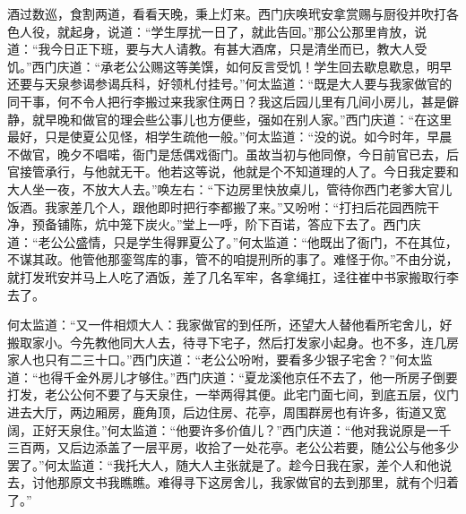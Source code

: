 酒过数巡，食割两道，看看天晚，秉上灯来。西门庆唤玳安拿赏赐与厨役并吹打各色人役，就起身，说道：“学生厚扰一日了，就此告回。”那公公那里肯放，说道：“我今日正下班，要与大人请教。有甚大酒席，只是清坐而已，教大人受饥。”西门庆道：“承老公公赐这等美馔，如何反言受饥！学生回去歇息歇息，明早还要与天泉参谒参谒兵科，好领札付挂号。”何太监道：“既是大人要与我家做官的同干事，何不令人把行李搬过来我家住两日？我这后园儿里有几间小房儿，甚是僻静，就早晚和做官的理会些公事儿也方便些，强如在别人家。”西门庆道：“在这里最好，只是使夏公见怪，相学生疏他一般。”何太监道：“没的说。如今时年，早晨不做官，晚夕不唱喏，衙门是恁偶戏衙门。虽故当初与他同僚，今日前官已去，后官接管承行，与他就无干。他若这等说，他就是个不知道理的人了。今日我定要和大人坐一夜，不放大人去。”唤左右：“下边房里快放桌儿，管待你西门老爹大官儿饭酒。我家差几个人，跟他即时把行李都搬了来。”又吩咐：“打扫后花园西院干净，预备铺陈，炕中笼下炭火。”堂上一呼，阶下百诺，答应下去了。西门庆道：“老公公盛情，只是学生得罪夏公了。”何太监道：“他既出了衙门，不在其位，不谋其政。他管他那銮驾库的事，管不的咱提刑所的事了。难怪于你。”不由分说，就打发玳安并马上人吃了酒饭，差了几名军牢，各拿绳扛，迳往崔中书家搬取行李去了。

何太监道：“又一件相烦大人：我家做官的到任所，还望大人替他看所宅舍儿，好搬取家小。今先教他同大人去，待寻下宅子，然后打发家小起身。也不多，连几房家人也只有二三十口。”西门庆道：“老公公吩咐，要看多少银子宅舍？”何太监道：“也得千金外房儿才够住。”西门庆道：“夏龙溪他京任不去了，他一所房子倒要打发，老公公何不要了与天泉住，一举两得其便。此宅门面七间，到底五层，仪门进去大厅，两边厢房，鹿角顶，后边住房、花亭，周围群房也有许多，街道又宽阔，正好天泉住。”何太监道：“他要许多价值儿？”西门庆道：“他对我说原是一千三百两，又后边添盖了一层平房，收拾了一处花亭。老公公若要，随公公与他多少罢了。”何太监道：“我托大人，随大人主张就是了。趁今日我在家，差个人和他说去，讨他那原文书我瞧瞧。难得寻下这房舍儿，我家做官的去到那里，就有个归着了。”

